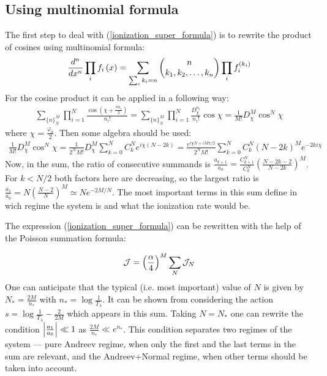 \subsection{Using multinomial formula}
The first step to deal with (\ref{ionization_super_formula}) is to rewrite the product of cosines using multinomial formula:
\begin{gather}
	\frac{d^n}{dx^n}
	\prod_i f_i\left(x\right)
	=
	\sum_{\sum_i k_i=n}
	\begin{pmatrix}
	n
	\\
	k_1,k_2,\dots,k_n
	\end{pmatrix}
	\prod_i
	f_i^{(k_i)}
\end{gather}
For the cosine product it can be applied in a following way:
\begin{gather}
	\sum_{\{n\}_{N}^{M}}\prod_{i=1}^{N}\frac{\cos(\chi+\frac{\pi n_{i}}{2})}{n_{i}!}=\sum_{\{n\}_{N}^{M}}\prod_{i=1}^{N}\frac{D_{\chi}^{n_{i}}}{n_{i}!}\cos\chi=\frac{1}{M!}D_{\chi}^{M}\cos^{N}\chi
\end{gather}
where $ \chi=\frac{\varphi_0 }{2}$. Then some algebra should be used:
\begin{multline}
\label{after_multinomial}
	\frac{1}{M!}D_{\chi}^{M}\cos^{N}\chi=
	\frac{1}{2^{N}M!}D_{\chi}^{M}\sum_{k=0}^{N}C_{k}^{N}e^{i\chi(N-2k)}
	=
	\frac{e^{i\chi N+iM\pi/2}}{2^{N}M!}\sum_{k=0}^{N}C_{k}^{N}(N-2k)^{M}e^{-2ki\chi}
\end{multline}
Now, in the sum, the ratio of consecutive summands is $ \frac{a_{k+1}}{a_{k}}=\frac{C_{k+1}^{N}}{C_{k}^{N}}\left(\frac{N-2k-2}{N-2k}\right)^{M} $. For $ k<N/2 $ both factors here are decreasing, so the largest ratio is $ \frac{a_{1}}{a_{0}}=N(\frac{N-2}{N})^{M}\simeq Ne^{-2M/N} $. The most important terms in this sum define in wich regime the system is and what the ionization rate would be. 

The expression (\ref{ionization_super_formula}) can be rewritten with the help of the Poisson summation formula:

\begin{gather}
	\mathcal{J}
	=
	\left(\frac{\alpha}{4}\right)^M
	\sum_N
	\mathcal{J}_{N}	
\end{gather}
One can anticipate that the typical (i.e. most important) value of $ N $ is given by $ N_{*}=\frac{2M}{n_{*}} $ with $ n_{*}=\log\frac{1}{T_{\lambda}} $. It can be shown from considering the action $ s=\log\frac{1}{T_\lambda}-\frac{2}{2M} $ which appears in this sum. Taking $ N=N_{*} $ one can rewrite the condition $ \left|\frac{a_{1}}{a_{0}}\right|\ll1 $ as $ \frac{2M}{n_{*}}\ll e^{n_{*}} $. This condition separates two regimes of the system --- pure Andreev regime, when only the first and the last terms in the sum are relevant, and the Andreev+Normal regime, when other terms should be taken into account.

